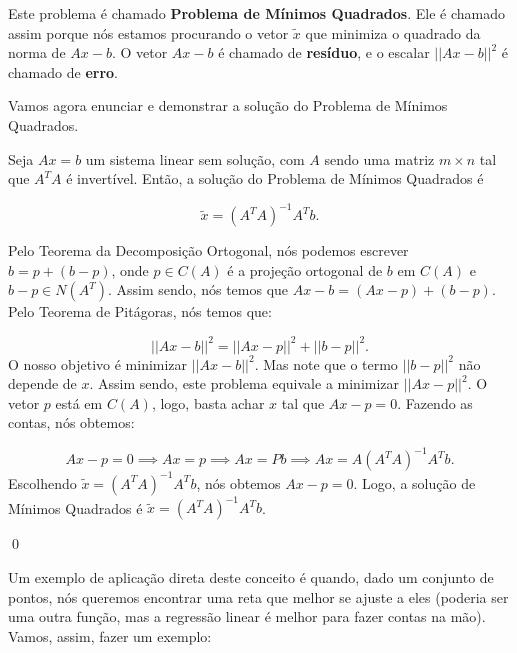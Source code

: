 Este problema é chamado \textbf{Problema de Mínimos Quadrados}. Ele é chamado assim porque nós estamos procurando o vetor $\tilde{x}$ que minimiza o quadrado da norma de $Ax - b$. O vetor $Ax - b$ é chamado de \textbf{resíduo}, e o escalar $||Ax - b||^2$ é chamado de \textbf{erro}.

Vamos agora enunciar e demonstrar a solução do Problema de Mínimos Quadrados.

\begin{Theorem}
	Seja $Ax = b$ um sistema linear sem solução, com $A$ sendo uma matriz $m\times n$ tal que $A^TA$ é invertível. Então, a solução do Problema de Mínimos Quadrados é
	
	$$
	\tilde{x} = (A^TA)^{-1}A^Tb.
	$$
\end{Theorem}

\begin{Proof}
	Pelo Teorema da Decomposição Ortogonal, nós podemos escrever $b = p + (b - p)$, onde $p\in C(A)$ é a projeção ortogonal de $b$ em $C(A)$ e $b - p\in N(A^T)$. Assim sendo, nós temos que $Ax - b = (Ax - p) + (b - p)$. Pelo Teorema de Pitágoras, nós temos que:
	
	$$
	||Ax - b||^2 = ||Ax - p||^2 + ||b - p||^2.
	$$
	O nosso objetivo é minimizar $||Ax - b||^2$. Mas note que o termo $||b - p||^2$ não depende de $x$. Assim sendo, este problema equivale a minimizar $||Ax - p||^2$. O vetor $p$ está em $C(A)$, logo, basta achar $x$ tal que $Ax - p = 0$. Fazendo as contas, nós obtemos:
	
	$$
	Ax - p = 0 \implies Ax = p\implies Ax = Pb\implies Ax = A(A^TA)^{-1}A^Tb.
	$$
	Escolhendo $\tilde{x} = (A^TA)^{-1}A^Tb$, nós obtemos $Ax - p = 0$. Logo, a solução de Mínimos Quadrados é $\tilde{x} = (A^TA)^{-1}A^Tb$.
	
	\qed
\end{Proof}

Um exemplo de aplicação direta deste conceito é quando, dado um conjunto de pontos, nós queremos encontrar uma reta que melhor se ajuste a eles (poderia ser uma outra função, mas a regressão linear é melhor para fazer contas na mão). Vamos, assim, fazer um exemplo:

